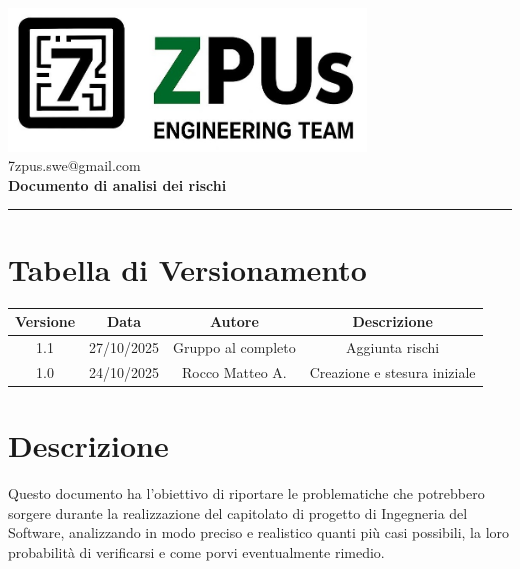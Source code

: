 \documentclass[a4paper,12pt]{article}
\begin{document}
\begin{center}
    \includegraphics[width=9.5cm]{../assets/logo7ZPUS.jpg}\\
    \small\hspace{10cm} 7zpus.swe@gmail.com\\
    \vspace{0.5cm}
    \Large \textbf{Documento di analisi dei rischi}\\
    \vspace{0.2cm}
\end{center}

\vspace{0.3cm}
\hrule
\vspace{0.3cm}

\tableofcontents

\newpage

\section*{Tabella di Versionamento}
    \begin{tabular}{|c|c|c|c|}
        \hline
        \textbf{Versione} & \textbf{Data} & \textbf{Autore} & \textbf{Descrizione} \\
        \hline
        1.1 & 27/10/2025 & Gruppo al completo & Aggiunta rischi \\
        \hline
        1.0 & 24/10/2025 & Rocco Matteo A. & Creazione e stesura iniziale \\
        \hline
    \end{tabular}

\section{Descrizione}
Questo documento ha l'obiettivo di riportare le problematiche che potrebbero sorgere durante la realizzazione del capitolato di progetto di Ingegneria del Software, analizzando in modo preciso e realistico quanti più casi possibili, la loro probabilità di verificarsi e come porvi eventualmente rimedio.


\vspace{0.5cm}
\end{document}

